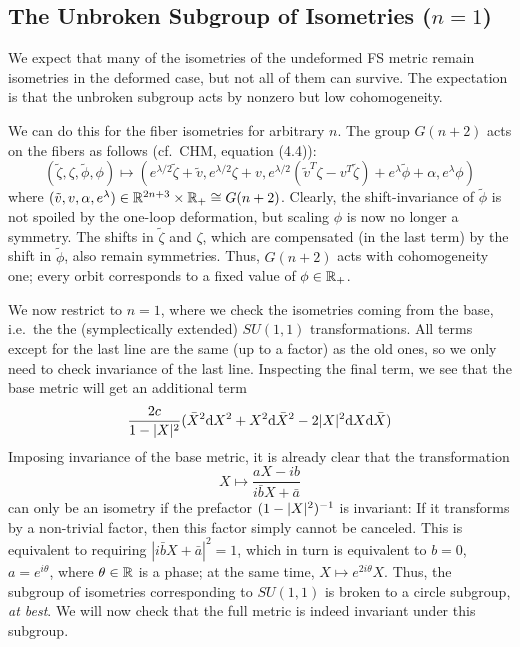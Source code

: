 \subsection{The Unbroken Subgroup of Isometries (\texorpdfstring{$n=1$}{n=1})}

We expect that many of the isometries of the undeformed FS metric remain isometries in the deformed case, but not all of them can survive. The expectation is that the unbroken subgroup acts by nonzero but low cohomogeneity.

We can do this for the fiber isometries for arbitrary $n$. The group $G(n+2)$ acts on the fibers as follows (cf.~CHM, equation (4.4)):
\begin{equation*}
	(\tilde\zeta,\zeta,\tilde\phi,\phi)\longmapsto
	(e^{\lambda/2}\tilde\zeta+\tilde v,e^{\lambda/2}\zeta+v,
	e^{\lambda/2}(\tilde v^T \zeta - v^T \tilde\zeta) +e^\lambda\tilde\phi +\alpha, e^\lambda \phi)
\end{equation*}
where $(\tilde v,v,\alpha,e^\lambda)\in \mathbb{R}^{2n+3}\times \mathbb{R}_+\cong G(n+2)$. Clearly, the shift-invariance of $\tilde\phi$ is not spoiled by the one-loop deformation, but scaling $\phi$ is now no longer a symmetry. The shifts in $\tilde\zeta$ and $\zeta$, which are compensated (in the last term) by the shift in $\tilde\phi$, also remain symmetries. Thus, $G(n+2)$ acts with cohomogeneity one; every orbit corresponds to a fixed value of $\phi\in \mathbb{R}_+$.

We now restrict to $n=1$, where we check the isometries coming from the base, i.e.~the the (symplectically extended) $SU(1,1)$ transformations. All terms except for the last line are the same (up to a factor) as the old ones, so we only need to check invariance of the last line. Inspecting the final term, we see that the base metric will get an additional term
\begin{equation*}
	\frac{2c}{1-\lvert X \rvert^2}(\bar X^2 \mathrm{d} X^2+ X^2\mathrm{d} \bar X^2-2\lvert X \rvert^2\mathrm{d} X \mathrm{d} \bar X)
\end{equation*}
Imposing invariance of the base metric, it is already clear that the transformation
\begin{equation*}
	X\longmapsto \frac{aX-ib}{i\bar b X+\bar a}
\end{equation*}
can only be an isometry if the prefactor $(1-\lvert X \rvert^2)^{-1}$ is invariant: If it transforms by a non-trivial factor, then this factor simply cannot be canceled. This is equivalent to requiring $|i\bar b X+\bar a|^2=1$, which in turn is equivalent to $b=0$, $a=e^{i\theta}$, where $\theta\in \mathbb{R}$ is a phase; at the same time, $X\mapsto e^{2i\theta}X$. Thus, the subgroup of isometries corresponding to $SU(1,1)$ is broken to a circle subgroup, \emph{at best}. We will now check that the full metric is indeed invariant under this subgroup.

